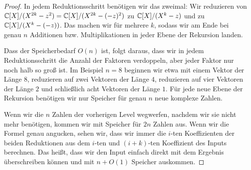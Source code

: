 \begin{proof}
    \medskip
    In jedem Reduktionsschritt benötigen wir das zweimal: Wir reduzieren von $\mathbb{C}[X]/(X^{2k}-z^2) = \mathbb{C}[X]/(X^{2k}-(-z)^2)$ zu $\mathbb{C}[X]/(X^k-z)$ und zu $\mathbb{C}[X]/(X^k-(-z))$.
    Das machen wir für mehrere $k$, sodass wir am Ende bei genau $n$ Additionen bzw. Multiplikationen in jeder Ebene der Rekursion landen.

    \medskip
    Dass der Speicherbedarf $O(n)$ ist, folgt daraus, dass wir in jedem Reduktionsschritt die Anzahl der Faktoren verdoppeln, aber jeder Faktor nur noch halb so groß ist. Im Beispiel $n=8$ beginnen wir etwa mit einem Vektor der Länge $8$, reduzieren auf zwei Vektoren der Länge $4$, reduzieren auf vier Vektoren der Länge $2$ und schließlich acht Vektoren der Länge $1$. Für jede neue Ebene der Rekursion benötigen wir nur Speicher für genau $n$ neue komplexe Zahlen.

    Wenn wir die $n$ Zahlen der vorherigen Level wegwerfen, nachdem wir sie nicht mehr benötigen, kommen wir mit Speicher für $2n$ Zahlen aus. Wenn wir die Formel genau angucken, sehen wir, dass wir immer die $i$-ten Koeffizienten der beiden Reduktionen aus dem $i$-ten und $(i+k)$-ten Koeffizient des Inputs berechnen. Das heißt, dass wir den Input einfach direkt mit dem Ergebnis überschreiben können und mit $n+O(1)$ Speicher auskommen.
\end{proof}